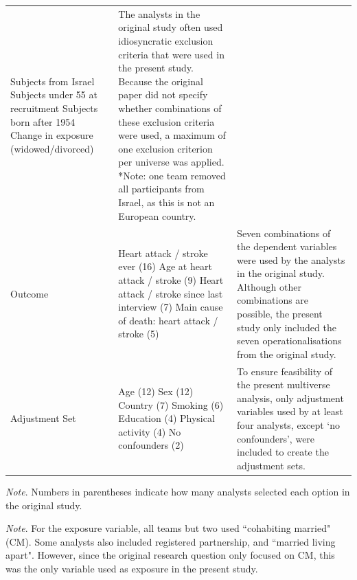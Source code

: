 \documentclass[
  man,
  floatsintext,
  longtable,
  nolmodern,
  notxfonts,
  notimes,
  colorlinks=true,linkcolor=blue,citecolor=blue,urlcolor=blue]{apa7}
\begin{document}
\begin{table}[htbp]
\begin{threeparttable}
\begin{tabularx}{\textwidth}{
>{\RaggedRight\arraybackslash}p{3.2cm}
>{\RaggedRight\arraybackslash}p{6.2cm}
>{\RaggedRight\arraybackslash}X
}
Subjects from Israel \newline
Subjects under 55 at recruitment \newline
Subjects born after 1954 \newline
Change in exposure (widowed/divorced)
&
The analysts in the original study often used idiosyncratic exclusion criteria that were used in the present study. Because the original paper did not specify whether combinations of these exclusion criteria were used, a maximum of one exclusion criterion per universe was applied. *Note: one team removed all participants from Israel, as this is not an European country. \\
\addlinespace
Outcome &
Heart attack / stroke ever (16) \newline
Age at heart attack / stroke (9) \newline
Heart attack / stroke since last interview (7) \newline
Main cause of death: heart attack / stroke (5)
&
Seven combinations of the dependent variables were used by the analysts in the original study. Although other combinations are possible, the present study only included the seven operationalisations from the original study. \\
\addlinespace
Adjustment Set &
Age (12) \newline
Sex (12) \newline
Country (7) \newline
Smoking (6) \newline
Education (4) \newline
Physical activity (4) \newline
No confounders (2)
&
To ensure feasibility of the present multiverse analysis, only adjustment variables used by at least four analysts, except `no confounders', were included to create the adjustment sets. \\
\bottomrule
\end{tabularx}
\begin{tablenotes}[flushleft]
\footnotesize
\item \textit{Note}. Numbers in parentheses indicate how many analysts selected each option in the original study.
\item \textit{Note}. For the exposure variable, all teams but two used ``cohabiting married" (CM). Some analysts also included registered partnership, and ``married living apart". However, since the original research question only focused on CM, this was the only variable used as exposure in the present study.
\end{tablenotes}
\end{threeparttable}
\end{table}
\end{document}
